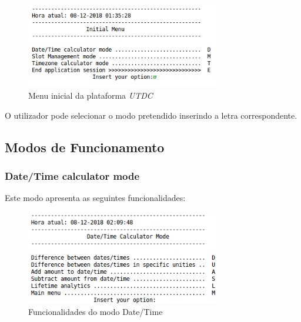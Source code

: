 \documentclass{article}
\begin{document}
\begin{figure}[H]
    \centering
    \includegraphics[width=8.5cm]{menu_inicial.png}
    \caption{Menu inicial da plataforma \textit{UTDC}}
\end{figure}

O utilizador pode selecionar o modo pretendido inserindo a letra correspondente.
\subsection{Modos de Funcionamento}

\subsubsection{Date/Time calculator mode}
Este modo apresenta as seguintes funcionalidades:

\begin{figure}[H]
    \centering
    \includegraphics[width=8.5cm]{date_time.png}
    \caption{Funcionalidades do modo Date/Time}
\end{figure}
\end{document}

